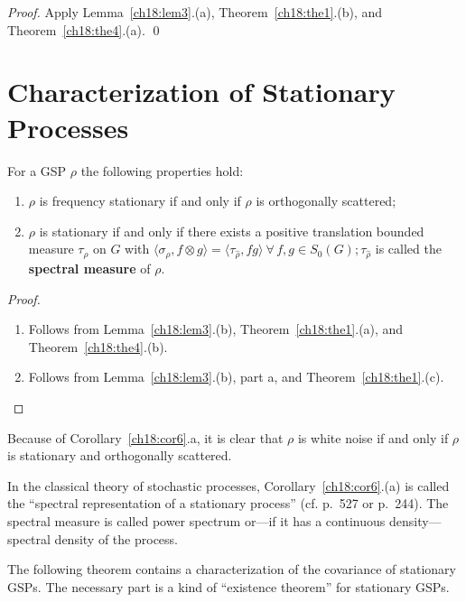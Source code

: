 \documentclass[graybox]{svmult}
\begin{document}
\begin{proof}
Apply Lemma~\ref{ch18:lem3}.(a), Theorem~\ref{ch18:the1}.(b), and Theorem~\ref{ch18:the4}.(a). \qed
\end{proof}

\section{Characterization of Stationary Processes}
\label{ch18:sec4}

\begin{corollary}\label{ch18:cor6}
For a GSP $\rho $ the following properties hold: %
\begin{enumerate}
\item[(a)] $\rho $ is  frequency stationary if and only if $\rho $ is
orthogonally scattered;

\item[(b)] $\rho $ is stationary if and only if there exists a positive translation bounded measure $\tau_{\hat{\rho}}$ on %
 $G$ with $\langle\sigma_{\hat{\rho}},f\otimes g\rangle =
\langle\tau_{\hat{\rho}},fg\rangle \ \forall \, f,g \in {S_{0}(G)};
\tau_{\hat{\rho}}$ is called the \textbf{spectral measure} of $\rho $.
\end{enumerate}
\end{corollary}

\begin{proof}\
\begin{enumerate}
\item[(a)] Follows from Lemma~\ref{ch18:lem3}.(b), Theorem~\ref{ch18:the1}.(a), and
Theorem~\ref{ch18:the4}.(b).

\item[(b)] Follows from Lemma~\ref{ch18:lem3}.(b), part a, and
Theorem~\ref{ch18:the1}.(c).
\end{enumerate}
\end{proof}

\begin{rem}
Because of Corollary~\ref{ch18:cor6}.a, it is clear that $ \rho $ is white noise if and only if $ \rho $ is
stationary and orthogonally scattered.
\end{rem}

\begin{rem}
In the classical theory of stochastic processes, Corollary~\ref{ch18:cor6}.(a)
is called the ``spectral representation of a stationary process'' (cf.
\cite{do90} p.~527 or \cite{gisk74} p.~244).  The spectral measure
is called power spectrum or---if it has a continuous density---spectral
density of the process.

The following theorem
contains a characterization of the covariance of stationary GSPs.  The
necessary part is a kind of ``existence theorem'' for stationary GSPs.
\end{rem}
\end{document}
